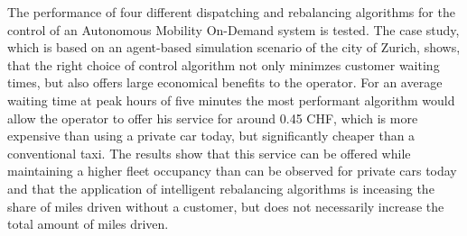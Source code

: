 The performance of four different dispatching and rebalancing algorithms for the
control of an Autonomous Mobility On-Demand system is tested. The case study,
which is based on an agent-based simulation scenario of the city of Zurich,
shows, that the right choice of control algorithm not only minimzes customer
waiting times, but also offers large economical benefits to the operator.
For an average waiting time at peak hours of five minutes the most performant
algorithm would allow the operator to offer his service for around 0.45 CHF, which
is more expensive than using a private car today, but significantly cheaper than
a conventional taxi. The results show that this service can be offered while
maintaining a higher fleet occupancy than can be observed for private cars
today and that the application of intelligent rebalancing algorithms is inceasing
the share of miles driven without a customer, but does not necessarily increase
the total amount of miles driven.
